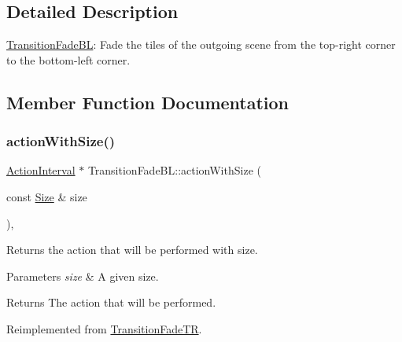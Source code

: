 \subsection{Detailed Description}
\hyperlink{classTransitionFadeBL}{Transition\+Fade\+BL}\+: Fade the tiles of the outgoing scene from the top-\/right corner to the bottom-\/left corner. 

\subsection{Member Function Documentation}
\mbox{\label{classTransitionFadeBL_a6701b53ec643eb3fc9e078c0feaf71b0}} 
\subsubsection{\texorpdfstring{action\+With\+Size()}{actionWithSize()}\hspace{0.1cm}{\footnotesize\ttfamily [1/2]}}
{\footnotesize\ttfamily \hyperlink{classActionInterval}{Action\+Interval} $\ast$ Transition\+Fade\+B\+L\+::action\+With\+Size (\begin{DoxyParamCaption}\item[{const \hyperlink{classSize}{Size} \&}]{size }\end{DoxyParamCaption})\hspace{0.3cm}{\ttfamily [override]}, {\ttfamily [virtual]}}

Returns the action that will be performed with size.


\begin{DoxyParams}{Parameters}
{\em size} & A given size. \\
\hline
\end{DoxyParams}
\begin{DoxyReturn}{Returns}
The action that will be performed. 
\end{DoxyReturn}


Reimplemented from \hyperlink{classTransitionFadeTR_a371a39553335050a845c6743d20aac00}{Transition\+Fade\+TR}.

\mbox{\label{classTransitionFadeBL_a2669695f07ed13e35046a1507e91abe6}} 
